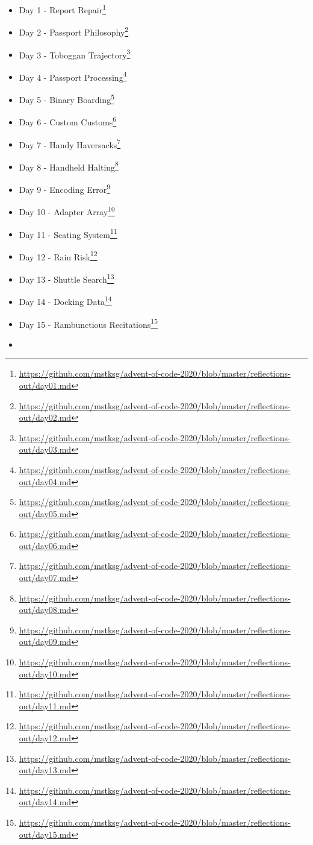 \documentclass[]{article}
\renewcommand{\href}[2]{#2\footnote{\url{#1}}}
\begin{document}
\begin{itemize}
\tightlist
\item
  \href{https://github.com/mstksg/advent-of-code-2020/blob/master/reflections-out/day01.md}{Day
  1 - Report Repair}
\item
  \href{https://github.com/mstksg/advent-of-code-2020/blob/master/reflections-out/day02.md}{Day
  2 - Passport Philosophy}
\item
  \href{https://github.com/mstksg/advent-of-code-2020/blob/master/reflections-out/day03.md}{Day
  3 - Toboggan Trajectory}
\item
  \href{https://github.com/mstksg/advent-of-code-2020/blob/master/reflections-out/day04.md}{Day
  4 - Passport Processing}
\item
  \href{https://github.com/mstksg/advent-of-code-2020/blob/master/reflections-out/day05.md}{Day
  5 - Binary Boarding}
\item
  \href{https://github.com/mstksg/advent-of-code-2020/blob/master/reflections-out/day06.md}{Day
  6 - Custom Customs}
\item
  \href{https://github.com/mstksg/advent-of-code-2020/blob/master/reflections-out/day07.md}{Day
  7 - Handy Haversacks}
\item
  \href{https://github.com/mstksg/advent-of-code-2020/blob/master/reflections-out/day08.md}{Day
  8 - Handheld Halting}
\item
  \href{https://github.com/mstksg/advent-of-code-2020/blob/master/reflections-out/day09.md}{Day
  9 - Encoding Error}
\item
  \href{https://github.com/mstksg/advent-of-code-2020/blob/master/reflections-out/day10.md}{Day
  10 - Adapter Array}
\item
  \href{https://github.com/mstksg/advent-of-code-2020/blob/master/reflections-out/day11.md}{Day
  11 - Seating System}
\item
  \href{https://github.com/mstksg/advent-of-code-2020/blob/master/reflections-out/day12.md}{Day
  12 - Rain Risk}
\item
  \href{https://github.com/mstksg/advent-of-code-2020/blob/master/reflections-out/day13.md}{Day
  13 - Shuttle Search}
\item
  \href{https://github.com/mstksg/advent-of-code-2020/blob/master/reflections-out/day14.md}{Day
  14 - Docking Data}
\item
  \href{https://github.com/mstksg/advent-of-code-2020/blob/master/reflections-out/day15.md}{Day
  15 - Rambunctious Recitations}
\item

\end{itemize}
\end{document}
